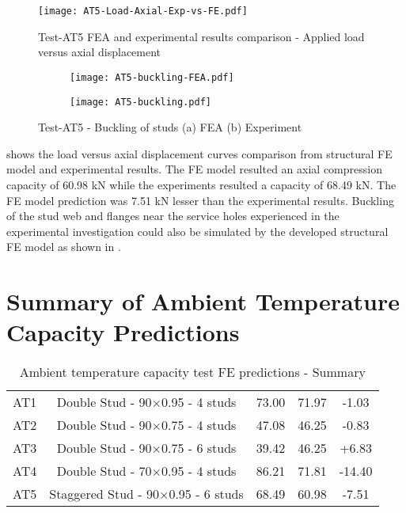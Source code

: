 \begin{figure}[!htbp]
	\centering
			\texttt{[image: AT5-Load-Axial-Exp-vs-FE.pdf]}\\
		\caption{Test-AT5 FEA and experimental results comparison - Applied load versus axial displacement}
		\label{fig:AT5-fea}
\end{figure}
\begin{figure}[!htbp]
	\centering
	\begin{subfigure}[b]{0.4\textwidth}
		\centering
		\texttt{[image: AT5-buckling-FEA.pdf]}
		\caption{}
		\label{subfig:AT5-buckling-FEA}
	\end{subfigure}
	\begin{subfigure}[b]{0.4\textwidth}
		\centering
		\texttt{[image: AT5-buckling.pdf]}
		\caption{}
		\label{subfig:AT5-buckling-experiment}
	\end{subfigure}
	   \caption{Test-AT5 - Buckling of studs (a) FEA (b) Experiment}
	   \label{fig:AT5-buckling-fea-comparison}
\end{figure} 

 shows the load versus axial displacement curves comparison from structural FE model and experimental results. The FE model resulted an axial compression capacity of 60.98 kN while the experiments resulted a capacity of 68.49 kN. The FE model prediction was 7.51 kN lesser than the experimental results. Buckling of the stud web and flanges near the service holes experienced in the experimental investigation could also be simulated by the developed structural FE model as shown in . 

\section{Summary of Ambient Temperature Capacity Predictions}

\begin{table}[!htbp]
	\centering
	\caption{Ambient temperature capacity test FE predictions - Summary}
	\begin{tabular}{ccccc}
		\toprule
		\multicolumn{1}{m{2.25em}}{\centering{Test Name}} & 
		\multicolumn{1}{m{8em}}{\centering{Description}} & 
		\multicolumn{1}{m{2.6em}}{\centering{Failure Load (kN) Test}} &
		\multicolumn{1}{m{2.6em}}{\centering{Failure Load (kN) FE}} &
		\multicolumn{1}{m{4.5em}}{\centering{FE Difference (kN)}} \\
		\midrule
		AT1  & Double Stud - 90$\times$0.95 - 4 studs & 73.00 & 71.97 & -1.03 \\
		AT2  & Double Stud - 90$\times$0.75 - 4 studs & 47.08 & 46.25 & -0.83 \\
		AT3  & Double Stud - 90$\times$0.75 - 6 studs & 39.42 & 46.25 & +6.83 \\
		AT4  & Double Stud - 70$\times$0.95 - 4 studs & 86.21 & 71.81 & -14.40 \\
		AT5  & Staggered Stud - 90$\times$0.95 - 6 studs & 68.49 & 60.98 & -7.51 \\
		\bottomrule
	\end{tabular}%
	\label{tab:ambient-test-results-fea}%
\end{table}%

